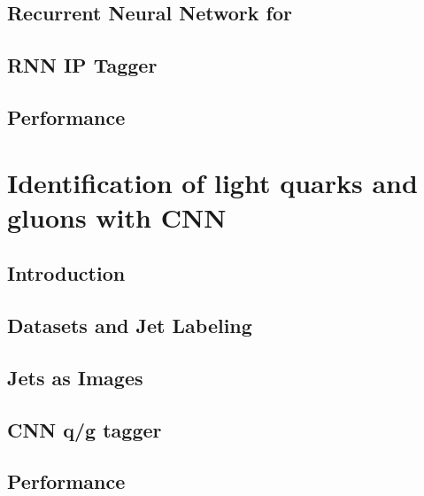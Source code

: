 \documentclass{report}
\begin{document}
\section{Recurrent Neural Network for \btagging}


\section{RNN IP Tagger}


\section{Performance}



\chapter{Identification of light quarks and gluons with CNN}
\label{chap:qgtagging}
\section{Introduction}


\section{Datasets and Jet Labeling}


\section{Jets as Images}


%

\section{CNN q/g tagger}


\section{Performance}

\end{document}
